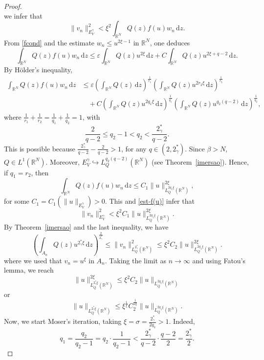 \documentclass[12pt]{amsart}
\newcommand{\R}{\mathbb{R}}
\begin{document}
\begin{proof}
$$	$$	
	we infer that
\begin{equation}\label{est-f(u)}
		\|v_n\|_{E_V^\gamma}^2 <\xi^2	 \int_{\R^N}Q(z)f(u)w_n\,\mathrm{d}z.
	\end{equation}
    From \eqref{fcond} and the estimate $w_n \leq u^{2\xi-1}$ in $\mathbb{R}^N$, one deduces
$$
	\int_{\R^N}Q(z)f(u)w_n\,\mathrm{d}z \leq \varepsilon\int_{\mathbb{R}^N}Q(z)u^{2\xi}\,\mathrm{d}z + C\int_{\mathbb{R}^N}Q(z)u^{2\xi+q-2}\,\mathrm{d}z.
	$$ 
    By H\"older's inequality,
	$$
	\begin{aligned}
		\int_{\R^N}Q(z)f(u)w_n\,\mathrm{d}z &\leq \varepsilon\left(\int_{\mathbb{R}^N}Q(z)\,\mathrm{d}z\right)^{\frac{1}{r_1}}\left(\int_{\mathbb{R}^N}Q(z)u^{2r_2\xi}\,\mathrm{d}z\right)^{\frac{1}{r_2}}
		\\
		&\quad + C\left(\int_{\mathbb{R}^N}Q(z)u^{2q_1\xi}\,\mathrm{d}z\right)^{\frac{1}{q_1}}\left(\int_{\mathbb{R}^N}Q(z)u^{q_2(q-2)}\,\mathrm{d}z\right)^{\frac{1}{q_2}},
	\end{aligned}
	$$	
	where $\frac{1}{r_1} + \frac{1}{r_2} =  \frac{1}{q_1} + \frac{1}{q_2}=1$, with 
$$
	\frac{2}{q-2}\leq q_2-1< q_2< \frac{2_\gamma^*}{q-2}.
	$$
	This is possible because $\frac{2_\gamma^*}{q-2} - \frac{2}{q-2}>1$, for any $q\in(2,2_\gamma^*)$. Since $\beta>N$, $Q\in L^1(\mathbb{R}^N)$. Moreover, $E_V^\gamma \hookrightarrow L_Q^{q_2(q-2)}(\mathbb{R}^N)$ (see Theorem~\ref{imersao}). Hence, if $q_1=r_2$, then
	$$
	\int_{\R^N}Q(z)f(u)w_n\,\mathrm{d}z \leq C_1\|u\|_{L^{2q_1\xi}_Q(\mathbb{R}^N)}^{2\xi},
	$$
	for some $C_1=C_1(\|u\|_{E^\gamma_V})>0$. This and \eqref{est-f(u)} infer that 
	$$
	\|v_n\|_{E_V^\gamma}^2 <\xi^2C_1\|u\|_{L^{2q_1\xi}_Q(\mathbb{R}^N)}^{2\xi}.
	$$
By Theorem~\ref{imersao} and the last inequality, we have
	$$
\left(\int_{A_n}Q(z)u^{2_\gamma^*\xi}\,\mathrm{d}z\right)^{\frac{2}{2_\gamma^*}}\leq\|v_n\|_{L^{2_\gamma^*}_Q(\mathbb{R}^N)}^2 \leq \xi^2C_2\|u\|_{L^{2q_1\xi}_Q(\mathbb{R}^N)}^{2\xi}.
	$$
where we used that $v_n=u^\xi$ in $A_n$. Taking the limit as $n\to \infty$ and using Fatou’s lemma, we reach
	$$
	\|u\|_{L^{2_\gamma^*\xi}_Q(\mathbb{R}^N)}^{2\xi} \leq \xi^2C_2\|u\|_{L^{2q_1\xi}_Q(\mathbb{R}^N)} 
	$$
    or
	\begin{equation}\label{inicial-ite-moser}
		\|u\|_{L^{2_\gamma^*\xi}_Q(\mathbb{R}^N)} \leq \xi^{\frac{1}{\xi}} C_2^{\frac{1}{2\xi}}\|u\|_{L^{2q_1\xi}_Q(\mathbb{R}^N)}.
	\end{equation}
Now, we start Moser's iteration, taking $\xi=\sigma= \frac{2_\gamma^*}{2q_1}>1$. Indeed,
	$$
	q_1=\frac{q_2}{q_2-1}=q_2\cdot\frac{1}{q_2-1}<\frac{2_\gamma^*}{q-2}\cdot \frac{q-2}{2} = \frac{2_\gamma^*}{2}.
$$
\end{proof}
\end{document}

